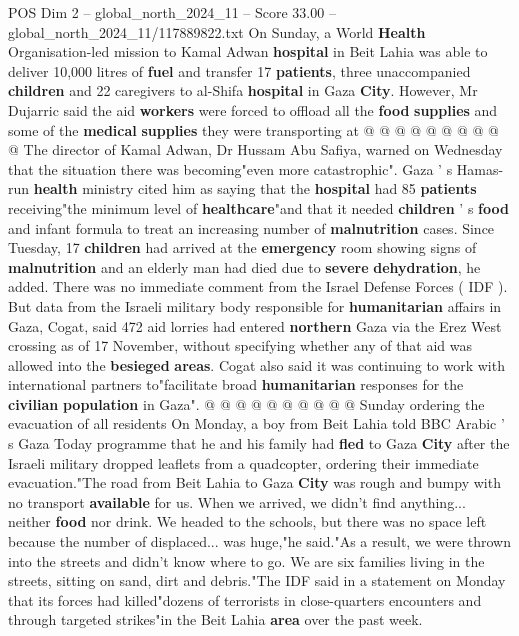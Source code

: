 \begin{textsample}{POS Dim 2 – global\_north\_2024\_11 – Score 33.00 – global\_north\_2024\_11/117889822.txt}
On Sunday, a World \textbf{Health} Organisation-led mission to Kamal Adwan \textbf{hospital} in Beit Lahia was able to deliver 10,000 litres of \textbf{fuel} and transfer 17 \textbf{patients}, three unaccompanied \textbf{children} and 22 caregivers to al-Shifa \textbf{hospital} in Gaza \textbf{City}.
However, Mr Dujarric said the aid \textbf{workers} were forced to offload all the \textbf{food} \textbf{supplies} and some of the \textbf{medical} \textbf{supplies} they were transporting at @ @ @ @ @ @ @ @ @ @ The director of Kamal Adwan, Dr Hussam Abu Safiya, warned on Wednesday that the situation there was becoming"even more catastrophic".
Gaza ' s Hamas-run \textbf{health} ministry cited him as saying that the \textbf{hospital} had 85 \textbf{patients} receiving"the minimum level of \textbf{healthcare}"and that it needed \textbf{children} ' s \textbf{food} and infant formula to treat an increasing number of \textbf{malnutrition} cases.
Since Tuesday, 17 \textbf{children} had arrived at the \textbf{emergency} room showing signs of \textbf{malnutrition} and an elderly man had died due to \textbf{severe} \textbf{dehydration}, he added.
There was no immediate comment from the Israel Defense Forces ( IDF ).
But data from the Israeli military body responsible for \textbf{humanitarian} affairs in Gaza, Cogat, said 472 aid lorries had entered \textbf{northern} Gaza via the Erez West crossing as of 17 November, without specifying whether any of that aid was allowed into the \textbf{besieged} \textbf{areas}.
Cogat also said it was continuing to work with international partners to"facilitate broad \textbf{humanitarian} responses for the \textbf{civilian} \textbf{population} in Gaza". @ @ @ @ @ @ @ @ @ @ Sunday ordering the evacuation of all residents On Monday, a boy from Beit Lahia told BBC Arabic ' s Gaza Today programme that he and his family had \textbf{fled} to Gaza \textbf{City} after the Israeli military dropped leaflets from a quadcopter, ordering their immediate evacuation."The road from Beit Lahia to Gaza \textbf{City} was rough and bumpy with no transport \textbf{available} for us.
When we arrived, we didn't find anything... neither \textbf{food} nor drink.
We headed to the schools, but there was no space left because the number of displaced... was huge,"he said."As a result, we were thrown into the streets and didn't know where to go.
We are six families living in the streets, sitting on sand, dirt and debris."The IDF said in a statement on Monday that its forces had killed"dozens of terrorists in close-quarters encounters and through targeted strikes"in the Beit Lahia \textbf{area} over the past week.

\end{textsample}
